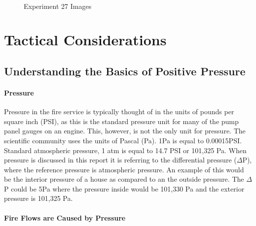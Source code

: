 \documentclass{article}
\begin{document}
\begin{figure}[H]
	\ContinuedFloat 
	\centering 
	 \ 
	\caption{Experiment 27 Images}
	\label{fig:Experiment31ImagesCont4} 
\end{figure}

\clearpage

\section{Tactical Considerations}

\subsection{Understanding the Basics of Positive Pressure}

\paragraph{Pressure} \mbox{}

Pressure in the fire service is typically thought of in the units of pounds per square inch (PSI), as this is the standard pressure unit for many of the pump panel gauges on an engine. This, however, is not the only unit for pressure. The scientific community uses the units of Pascal (Pa).  1Pa is equal to 0.00015PSI. Standard atmospheric pressure, 1 atm  is equal to 14.7 PSI or 101,325 Pa. When pressure is discussed in this report it is referring to the differential pressure ($\Delta$P), where the reference pressure is atmospheric pressure. An example of this would be the interior pressure of a house as compared to an the outside pressure. The $\Delta$P could be 5Pa where the pressure inside would be 101,330 Pa and the exterior pressure is 101,325 Pa.  

\paragraph{Fire Flows are Caused by Pressure} \mbox{}
\end{document}
